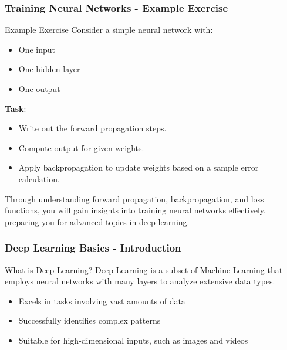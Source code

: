 \documentclass[aspectratio=169]{beamer}
\begin{document}
\begin{frame}[fragile]
    \frametitle{Training Neural Networks - Example Exercise}
    \begin{block}{Example Exercise}
        Consider a simple neural network with:
        \begin{itemize}
            \item One input
            \item One hidden layer
            \item One output
        \end{itemize}
        \textbf{Task}:
        \begin{itemize}
            \item Write out the forward propagation steps.
            \item Compute output for given weights.
            \item Apply backpropagation to update weights based on a sample error calculation.
        \end{itemize}
    \end{block}
    
    Through understanding forward propagation, backpropagation, and loss functions, you will gain insights into training neural networks effectively, preparing you for advanced topics in deep learning.
\end{frame}

\begin{frame}[fragile]
    \frametitle{Deep Learning Basics - Introduction}
    \begin{block}{What is Deep Learning?}
        Deep Learning is a subset of Machine Learning that employs neural networks with many layers to analyze extensive data types. 
    \end{block}
    \begin{itemize}
        \item Excels in tasks involving vast amounts of data
        \item Successfully identifies complex patterns
        \item Suitable for high-dimensional inputs, such as images and videos
    \end{itemize}
\end{frame}
\end{document}
